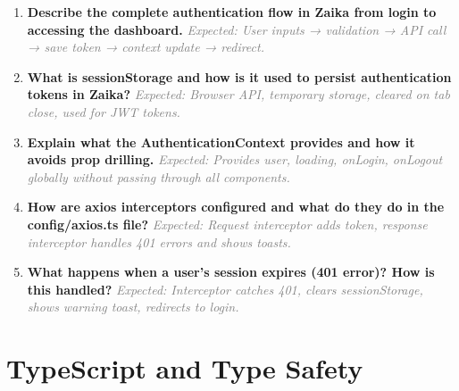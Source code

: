 \documentclass[12pt]{article}
\begin{document}
\begin{enumerate}[label=\textbf{\arabic*.}, itemsep=0.5cm, start=11]

\item \textbf{Describe the complete authentication flow in Zaika from login to accessing the dashboard.}
\newline
\textcolor{gray}{\textit{Expected: User inputs → validation → API call → save token → context update → redirect.}}

\item \textbf{What is sessionStorage and how is it used to persist authentication tokens in Zaika?}
\newline
\textcolor{gray}{\textit{Expected: Browser API, temporary storage, cleared on tab close, used for JWT tokens.}}

\item \textbf{Explain what the AuthenticationContext provides and how it avoids prop drilling.}
\newline
\textcolor{gray}{\textit{Expected: Provides user, loading, onLogin, onLogout globally without passing through all components.}}

\item \textbf{How are axios interceptors configured and what do they do in the config/axios.ts file?}
\newline
\textcolor{gray}{\textit{Expected: Request interceptor adds token, response interceptor handles 401 errors and shows toasts.}}

\item \textbf{What happens when a user's session expires (401 error)? How is this handled?}
\newline
\textcolor{gray}{\textit{Expected: Interceptor catches 401, clears sessionStorage, shows warning toast, redirects to login.}}

\end{enumerate}

\section*{TypeScript and Type Safety}
\end{document}
